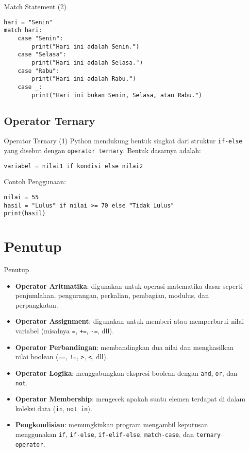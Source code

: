 \documentclass[aspectratio=169, table]{beamer}
\begin{document}
\begin{frame}[fragile]{Match Statement (2)}
\begin{lstlisting}[style=PythonStyle, caption={match_statement.py}]
hari = "Senin"
match hari:
    case "Senin":
        print("Hari ini adalah Senin.")
    case "Selasa":
        print("Hari ini adalah Selasa.")
    case "Rabu":
        print("Hari ini adalah Rabu.")
    case _:
        print("Hari ini bukan Senin, Selasa, atau Rabu.")
\end{lstlisting}
\end{frame}

\subsection{Operator Ternary}

\begin{frame}[fragile]{Operator Ternary (1)}
Python mendukung bentuk singkat dari struktur \texttt{if-else} yang disebut dengan \texttt{operator ternary}. Bentuk dasarnya adalah:

\begin{lstlisting}[style=PythonStyle]
variabel = nilai1 if kondisi else nilai2
\end{lstlisting}

Contoh Penggunaan:

\begin{lstlisting}[style=PythonStyle, caption={ternary_operator.py}]
nilai = 55
hasil = "Lulus" if nilai >= 70 else "Tidak Lulus"
print(hasil)
\end{lstlisting}
\end{frame}

\section{Penutup}

\begin{frame}{Penutup}
\begin{itemize}
    \item \textbf{Operator Aritmatika}: digunakan untuk operasi matematika dasar seperti penjumlahan, pengurangan, perkalian, pembagian, modulus, dan perpangkatan.
    \item \textbf{Operator Assignment}: digunakan untuk memberi atau memperbarui nilai variabel (misalnya \texttt{=}, \texttt{+=}, \texttt{-=}, dll).
    \item \textbf{Operator Perbandingan}: membandingkan dua nilai dan menghasilkan nilai boolean (\texttt{==}, \texttt{!=}, \texttt{>}, \texttt{<}, dll).
    \item \textbf{Operator Logika}: menggabungkan ekspresi boolean dengan \texttt{and}, \texttt{or}, dan \texttt{not}.
    \item \textbf{Operator Membership}: mengecek apakah suatu elemen terdapat di dalam koleksi data (\texttt{in}, \texttt{not in}).
    \item \textbf{Pengkondisian}: memungkinkan program mengambil keputusan menggunakan \texttt{if}, \texttt{if-else}, \texttt{if-elif-else}, \texttt{match-case}, dan \texttt{ternary operator}.
\end{itemize}
\end{frame}
\end{document}
